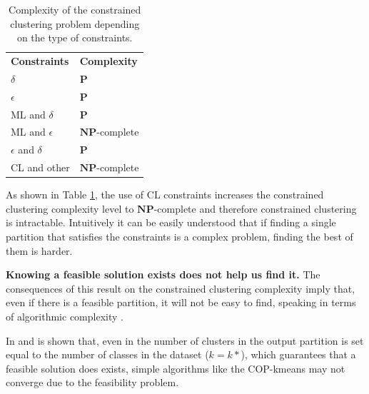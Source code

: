 \begin{table}[!h]
	\centering
	\setlength{\tabcolsep}{7pt}
	\renewcommand{\arraystretch}{1.2}
	\begin{tabular}{ >{\centering\arraybackslash}m{4cm}  >{\centering\arraybackslash}m{4cm} }
		\hline
		\textbf{Constraints} & \textbf{Complexity} \\
		$\delta$ & $\mathbf{P}$ \\
		$\epsilon$ & $\mathbf{P}$ \\
		\acs{ML} and $\delta$ & $\mathbf{P}$ \\
		\acs{ML} and $\epsilon$ & $\mathbf{NP}$-complete \\
		$\epsilon$ and $\delta$ & $\mathbf{P}$ \\
		\acs{CL} and other & $\mathbf{NP}$-complete \\
		\hline
		
	\end{tabular}%
	\caption[Complexity of the constrained clustering problem depending on the type of constraints.]{Complexity of the constrained clustering problem depending on the type of constraints. \cite{davidson2007survey}}
\label{tab:CCComplexity}
\end{table}

As shown in Table \ref{tab:CCComplexity}, the use of \acf{CL} constraints increases the constrained clustering complexity level to $\mathbf{NP}$-complete and therefore constrained clustering is intractable. Intuitively it can be easily understood that if finding a single partition that satisfies the constraints is a complex problem, finding the best of them is harder.

\begin{observation}
	
	\textbf{Knowing a feasible solution exists does not help us find it.} The consequences of this result on the constrained clustering complexity imply that, even if there is a feasible partition, it will not be easy to find, speaking in terms of algorithmic complexity \cite{davidson2007survey}.
	\label{ob:FeasibleSolution}
	
\end{observation}

In \cite{wagstaff2002intelligent} and \cite{davidson2007hierarchical} is shown that, even in the number of clusters in the output partition is set equal to the number of classes in the dataset ($k = k*$), which guarantees that a feasible solution does exists, simple algorithms like the COP-kmeans \cite{wagstaff2001constrained} may not converge due to the feasibility problem.

